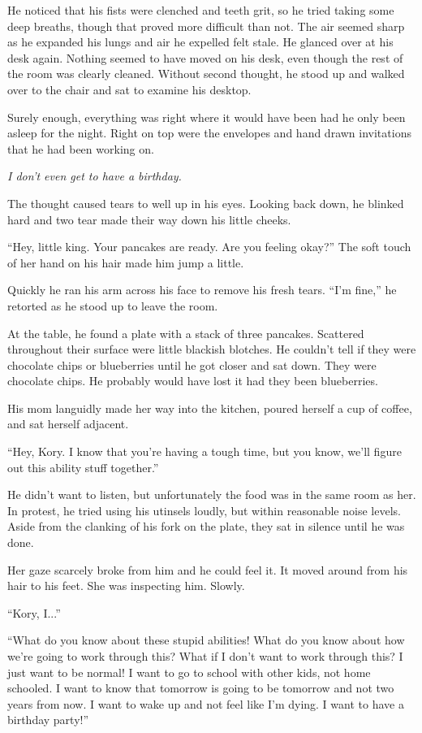 \documentclass[9pt]{memoir}
\begin{document}
He noticed that his fists were clenched and teeth grit, so he tried taking some deep breaths, though that proved more difficult than not. The air seemed sharp as he expanded his lungs and air he expelled felt stale. He glanced over at his desk again. Nothing seemed to have moved on his desk, even though the rest of the room was clearly cleaned. Without second thought, he stood up and walked over to the chair and sat to examine his desktop.

Surely enough, everything was right where it would have been had he only been asleep for the night. Right on top were the envelopes and hand drawn invitations that he had been working on.

\textit{I don't even get to have a birthday.}

The thought caused tears to well up in his eyes. Looking back down, he blinked hard and two tear made their way down his little cheeks.

``Hey, little king. Your pancakes are ready. Are you feeling okay?'' The soft touch of her hand on his hair made him jump a little.

Quickly he ran his arm across his face to remove his fresh tears. ``I'm fine,'' he retorted as he stood up to leave the room.

At the table, he found a plate with a stack of three pancakes. Scattered throughout their surface were little blackish blotches. He couldn't tell if they were chocolate chips or blueberries until he got closer and sat down. They were chocolate chips. He probably would have lost it had they been blueberries.

His mom languidly made her way into the kitchen, poured herself a cup of coffee, and sat herself adjacent.

``Hey, Kory. I know that you're having a tough time, but you know, we'll figure out this ability stuff together.''

He didn't want to listen, but unfortunately the food was in the same room as her. In protest, he tried using his utinsels loudly, but within reasonable noise levels. Aside from the clanking of his fork on the plate, they sat in silence until he was done.

Her gaze scarcely broke from him and he could feel it. It moved around from his hair to his feet. She was inspecting him. Slowly.

``Kory, I...''

``What do you know about these stupid abilities! What do you know about how we're going to work through this? What if I don't want to work through this? I just want to be normal! I want to go to school with other kids, not home schooled. I want to know that tomorrow is going to be tomorrow and not two years from now. I want to wake up and not feel like I'm dying. I want to have a birthday party!''
\end{document}
